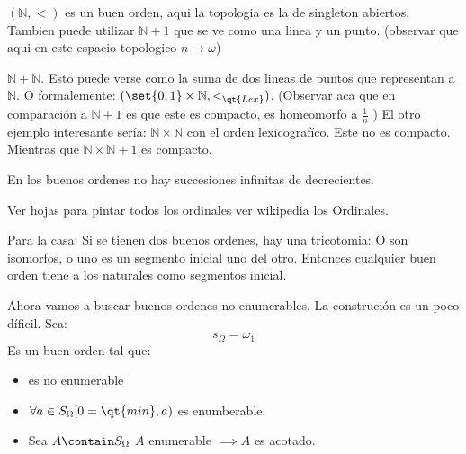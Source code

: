 \begin{exm}
	$ (\mathbb{N}, < ) $ es un buen orden, aqui la topologia es la de singleton abiertos. Tambien puede utilizar $ \mathbb{N} + 1$ que se ve como una linea y un punto. (observar que aqui en este espacio topologico  $ n \rightarrow \omega $) 
\end{exm}
\begin{exm}
	$ \mathbb{N} + \mathbb{N} $. Esto puede verse como la suma de dos lineas de puntos que representan a $\mathbb{N} $. O formalemente: $ (\set{0,1} \times \mathbb{N}, <_{\qt{Lex}} ) $. (Observar aca que en comparación a $ \mathbb{N} + 1 $ es que este es compacto, es homeomorfo a $ \frac{1}{n}$ )
	El otro ejemplo interesante sería: $ \mathbb{N} \times \mathbb{N} $ con el orden lexicografíco. Este no es compacto.
	Mientras que $ \mathbb{N} \times \mathbb{N} + 1$ es compacto.
\end{exm}
En los buenos ordenes no hay succesiones infinitas de decrecientes.
\begin{exm}
	Ver hojas para pintar todos los ordinales ver wikipedia los Ordinales.
\end{exm}
Para la casa: Si se tienen dos buenos ordenes, hay una tricotomia: O son isomorfos, o uno es un segmento inicial uno del otro. Entonces cualquier buen orden tiene a los naturales como segmentos inicial.

Ahora vamos a buscar buenos ordenes no enumerables. La construción es un poco díficil.
Sea:
\[ s_\Omega = \omega_1 \]
Es un buen orden tal que:
\begin{itemize}
	\item es no enumerable
	\item $ \forall a \in S_{\Omega} [0 = \qt{min}, a) $ es enumberable.
	\item Sea $ A \contain S_\Omega$ $A$ enumerable $ \implies A$ es acotado.
\end{itemize}

